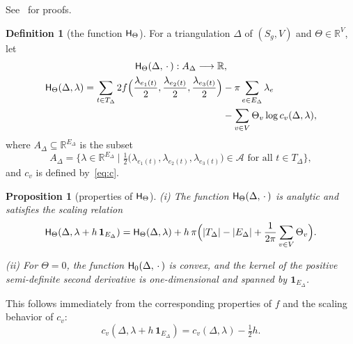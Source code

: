 \documentclass[a4paper, 11pt]{article}
\newcommand{\R}{\mathbb{R}}
\newcommand{\Acal}{\mathcal{A}}
\newcommand{\Hsf}{\scalebox{0.94}{$\mathsf{H}$}}
\theoremstyle{plain}
\newtheorem{proposition}[theorem]{Proposition}
\theoremstyle{definition}
\newtheorem{definition}[theorem]{Definition}
\begin{document}
\noindent%
See~\cite[Sec.~4.2]{bobenko15} for proofs.

\begin{definition}[the function $\Hsf_{\Theta}$]
  \label{def:Hsf}
  For a triangulation $\Delta$ of $(S_{g},V)$ and $\Theta\in\R^{V}$,
  let 
  \begin{gather}
    \notag
    \Hsf_{\Theta}(\Delta,\,\cdot\,):A_{\Delta}\longrightarrow\R,
    \\
    \begin{split}
      \Hsf_\Theta{}(\Delta,\lambda)= 
      \sum_{t\in T_{\Delta}} 
      2f \Big(
      \frac{\lambda_{e_{1}(t)}}{2}, 
      \frac{\lambda_{e_{2}(t)}}{2},
      \frac{\lambda_{e_{3}(t)}}{2} 
      \Big) 
      &-\pi\sum_{e\in E_{\Delta}}\lambda_{e} \\
      &-\sum_{v\in V}\Theta_{v}\log c_{v}(\Delta,\lambda),
    \end{split}
    \label{eq:Hsf}
  \end{gather}
  where $A_{\Delta}\subseteq\R^{E_{\Delta}}$ is the subset
  \begin{equation}
    \label{eq:ADelta}
    A_{\Delta}=\big\{\lambda\in\R^{E_{\Delta}}
    \;\big|\;
    \tfrac{1}{2}\big(
    \lambda_{e_{1}(t)},
    \lambda_{e_{2}(t)},
    \lambda_{e_{3}(t)}
    \big)\in \Acal
    \text{ for all }
    t\in T_{\Delta}
    \big\},
  \end{equation}
  and $c_{v}$ is defined by~\eqref{eq:c}.
\end{definition}

\begin{proposition}[properties of $\Hsf_{\Theta}$]
  \label{prop:Hsf}
  (i) The function $\Hsf_{\Theta}(\Delta,\,\cdot\,)$ is analytic and
  satisfies the scaling relation
  \begin{equation}
    \label{eq:Hsfscale}
    \Hsf_{\Theta}(\Delta,\lambda+h\,\mathbf{1}_{E_{\Delta}})
    =\Hsf_{\Theta}(\Delta,\lambda)+
    h\,\pi
    \Big(
    |T_{\Delta}|-|E_{\Delta}|+\frac{1}{2\pi}\sum_{v\in V}\Theta_{v}
    \Big).
  \end{equation}
  
  (ii) For $\Theta=0$, the function $\Hsf_{0}(\Delta,\,\cdot\,)$ is
  convex, and the kernel of the positive semi-definite second
  derivative is one-dimensional and spanned by
  $\mathbf{1}_{E_{\Delta}}$.
\end{proposition}

This follows immediately from the corresponding properties of $f$ and
the scaling behavior of $c_{v}$:
\begin{equation}
  \label{eq:cscale}
  c_{v}(\Delta,\lambda+h\,\mathbf{1}_{E_{\Delta}})=
  c_{v}(\Delta,\lambda)-\tfrac{1}{2}h.
\end{equation}
\end{document}
